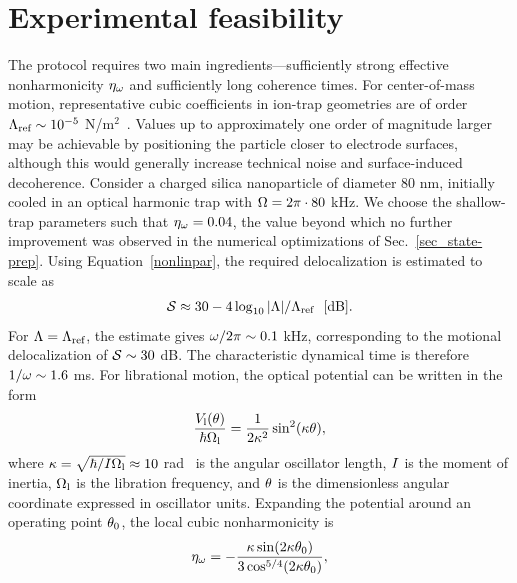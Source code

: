 \documentclass[reprint,prx,footinbib,floatfix,twocolumn,longbibliography,superscriptaddress]{revtex4-2}
\begin{document}
\section{Experimental feasibility}
\label{sec_exp}
The protocol requires two main ingredients---sufficiently strong effective nonharmonicity $\eta_{\omega}$ and sufficiently long coherence times.
For center-of-mass motion, representative cubic coefficients in ion-trap geometries are of order $\Lambda_\text{ref} \sim 10^{-5}$ N/m$^2$~\cite{Home2011}.
Values up to approximately one order of magnitude larger may be achievable by positioning the particle closer to electrode surfaces, although this would generally increase technical noise and surface-induced decoherence.
Consider a charged silica nanoparticle of diameter 80 nm, initially cooled in an optical harmonic trap with $\Omega = 2\pi \cdot 80$ kHz.
We choose the shallow-trap parameters such that $\eta_{\omega} = 0.04$, the value beyond which no further improvement was observed in the numerical optimizations of Sec.~\ref{sec_state-prep}.
Using Equation~\eqref{nonlinpar}, the required delocalization is estimated to scale as
\begin{align}
    \mathcal{S} \approx 30 - 4 \log_{10} |\Lambda| / \Lambda_\text{ref} \ \ [\text{dB}].
\end{align}
For $\Lambda = \Lambda_\text{ref}$, the estimate gives $\omega/2\pi \sim 0.1$ kHz, corresponding to the motional delocalization of $\mathcal{S} \sim 30 $ dB.
The characteristic dynamical time is therefore $1/\omega \sim 1.6$ ms.
For librational motion, the optical potential can be written in the form
\begin{align}
    \frac{V_{\text{l}}  (\theta)}{ \hbar \Omega_{\text{l}}} = \frac{1}{2 \kappa^2}\sin^2(\kappa \theta),
\end{align}
where $\kappa = \sqrt{\hbar / I \Omega_{\text{l}}} \approx 10$ {\textmu}rad~\cite{Dania2025,Troyer2026} is the angular oscillator length, $I $ is the moment of inertia, $\Omega_{\text{l}}$ is the libration frequency, and $\theta$ is the dimensionless angular coordinate expressed in oscillator units.
Expanding the potential around an operating point $\theta_0$, the local cubic nonharmonicity is
\begin{align}
    \eta_\omega = -\frac{\kappa \sin(2 \kappa \theta_0)}{3 \cos^{5/4}(2 \kappa \theta_0)}  ,
\end{align}
\end{document}
